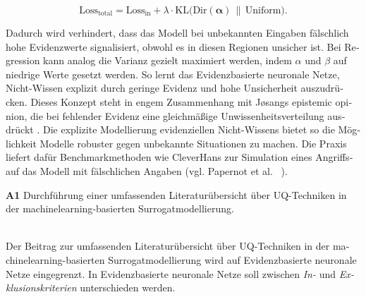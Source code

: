 \begin{otherlanguage}{ngerman}
\begin{equation}
\text{Loss}_{\text{total}} 
= \text{Loss}_{\text{in}} 
+ \lambda \cdot \text{KL}\bigl(\text{Dir}(\boldsymbol{\alpha}) \,\|\, \text{Uniform}\bigr).
\end{equation}

Dadurch wird verhindert, dass das Modell bei unbekannten Eingaben fälschlich hohe Evidenzwerte signalisiert, obwohl es in diesen Regionen unsicher ist. Bei Regression kann analog die Varianz gezielt maximiert werden, indem \(\alpha\) und \(\beta\) auf niedrige Werte gesetzt werden. So lernt das \gls{Evidenzbasierte neuronale Netze}, Nicht-Wissen explizit durch geringe Evidenz und hohe Unsicherheit auszudrücken. Dieses Konzept steht in engem Zusammenhang mit Jøsangs \glqq epistemic opinion\grqq{}, die bei fehlender Evidenz eine gleichmäßige Unwissenheitsverteilung ausdrückt \parencite[S. 22]{josang2016subjective}. Die explizite Modellierung evidenziellen Nicht-Wissens bietet so die Möglichkeit Modelle robuster gegen unbekannte Situationen zu machen. Die Praxis liefert dafür Benchmarkmethoden wie CleverHans zur Simulation eines \glqq Angriffs\grqq auf das Modell mit fälschlichen Angaben (vgl. Papernot et al. ~\parencite{papernot2016cleverhans}).




\pagebreak


\textbf{A1} Durchführung einer umfassenden Literaturübersicht über UQ-Techniken in der \gls{machinelearning}-basierten Surrogatmodellierung.
\par\noindent\\

Der Beitrag zur umfassenden Literaturübersicht über UQ-Techniken in der \gls{machinelearning}-basierten Surrogatmodellierung wird auf \gls{Evidenzbasierte neuronale Netze} eingegrenzt. In \gls{Evidenzbasierte neuronale Netze} soll zwischen \textit{In-} und \textit{Exklusionskriterien} unterschieden werden.


\end{otherlanguage}
